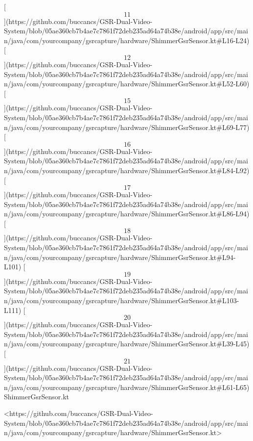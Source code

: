 \documentclass[12pt,a4paper]{article}
\begin{document}
{[\[11\]](https://github.com/buccancs/GSR-Dual-Video-System/blob/05ae360cb7b4ae7c7861f72deb235ad64a74b38e/android/app/src/main/java/com/yourcompany/gsrcapture/hardware/ShimmerGsrSensor.kt#L16-L24)
[\[12\]](https://github.com/buccancs/GSR-Dual-Video-System/blob/05ae360cb7b4ae7c7861f72deb235ad64a74b38e/android/app/src/main/java/com/yourcompany/gsrcapture/hardware/ShimmerGsrSensor.kt#L52-L60)
[\[15\]](https://github.com/buccancs/GSR-Dual-Video-System/blob/05ae360cb7b4ae7c7861f72deb235ad64a74b38e/android/app/src/main/java/com/yourcompany/gsrcapture/hardware/ShimmerGsrSensor.kt#L69-L77)
[\[16\]](https://github.com/buccancs/GSR-Dual-Video-System/blob/05ae360cb7b4ae7c7861f72deb235ad64a74b38e/android/app/src/main/java/com/yourcompany/gsrcapture/hardware/ShimmerGsrSensor.kt#L84-L92)
[\[17\]](https://github.com/buccancs/GSR-Dual-Video-System/blob/05ae360cb7b4ae7c7861f72deb235ad64a74b38e/android/app/src/main/java/com/yourcompany/gsrcapture/hardware/ShimmerGsrSensor.kt#L86-L94)
[\[18\]](https://github.com/buccancs/GSR-Dual-Video-System/blob/05ae360cb7b4ae7c7861f72deb235ad64a74b38e/android/app/src/main/java/com/yourcompany/gsrcapture/hardware/ShimmerGsrSensor.kt#L94-L101)
[\[19\]](https://github.com/buccancs/GSR-Dual-Video-System/blob/05ae360cb7b4ae7c7861f72deb235ad64a74b38e/android/app/src/main/java/com/yourcompany/gsrcapture/hardware/ShimmerGsrSensor.kt#L103-L111)
[\[20\]](https://github.com/buccancs/GSR-Dual-Video-System/blob/05ae360cb7b4ae7c7861f72deb235ad64a74b38e/android/app/src/main/java/com/yourcompany/gsrcapture/hardware/ShimmerGsrSensor.kt#L39-L45)
[\[21\]](https://github.com/buccancs/GSR-Dual-Video-System/blob/05ae360cb7b4ae7c7861f72deb235ad64a74b38e/android/app/src/main/java/com/yourcompany/gsrcapture/hardware/ShimmerGsrSensor.kt#L61-L65)
ShimmerGsrSensor.kt

<https://github.com/buccancs/GSR-Dual-Video-System/blob/05ae360cb7b4ae7c7861f72deb235ad64a74b38e/android/app/src/main/java/com/yourcompany/gsrcapture/hardware/ShimmerGsrSensor.kt>

}
\end{document}
